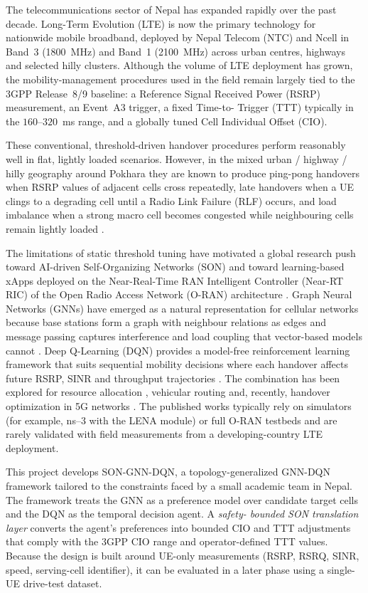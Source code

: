 \documentclass[12pt,a4paper,oneside]{report}
\begin{document}
The telecommunications sector of Nepal has expanded rapidly over the past
decade. Long-Term Evolution (LTE) is now the primary technology for
nationwide mobile broadband, deployed by Nepal Telecom (NTC) and Ncell in
Band~3 (1800~MHz) and Band~1 (2100~MHz) across urban centres, highways
and selected hilly clusters. Although the volume of LTE deployment has
grown, the mobility-management procedures used in the field remain
largely tied to the 3GPP Release~8/9 baseline: a Reference Signal
Received Power (RSRP) measurement, an Event~A3 trigger, a fixed Time-to-
Trigger (TTT) typically in the $160$--$320$~ms range, and a globally
tuned Cell Individual Offset (CIO).

These conventional, threshold-driven handover procedures perform
reasonably well in flat, lightly loaded scenarios. However, in the
mixed urban / highway / hilly geography around Pokhara they are known to
produce ping-pong handovers when RSRP values of adjacent cells cross
repeatedly, late handovers when a UE clings to a degrading cell until a
Radio Link Failure (RLF) occurs, and load imbalance when a strong macro
cell becomes congested while neighbouring cells remain lightly loaded
\cite{3gpp_36839,zhang_mlb_2021}.

The limitations of static threshold tuning have motivated a global
research push toward AI-driven Self-Organizing Networks (SON) and toward
learning-based xApps deployed on the Near-Real-Time RAN Intelligent
Controller (Near-RT RIC) of the Open Radio Access Network (O-RAN)
architecture \cite{oran_alliance_wg2,polese_oran_survey}. Graph Neural
Networks (GNNs) have emerged as a natural representation for cellular
networks because base stations form a graph with neighbour relations as
edges and message passing captures interference and load coupling that
vector-based models cannot \cite{kipf_gcn,velickovic_gat,hamilton_graphsage}.
Deep Q-Learning (DQN) provides a model-free reinforcement learning
framework that suits sequential mobility decisions where each handover
affects future RSRP, SINR and throughput trajectories
\cite{mnih_dqn_2015}. The combination has been explored for resource
allocation \cite{wang_gnn_rl_2022}, vehicular routing
\cite{he_vanet_gnn} and, recently, handover optimization in 5G networks
\cite{tang_handover_drl,zhao_gnn_handover}. The published works typically
rely on simulators (for example, ns--3 with the LENA module) or full
O-RAN testbeds and are rarely validated with field measurements from a
developing-country LTE deployment.

This project develops SON-GNN-DQN, a topology-generalized GNN-DQN
framework tailored to the constraints faced by a small academic team in
Nepal. The framework treats the GNN as a preference model over candidate
target cells and the DQN as the temporal decision agent. A \emph{safety-
bounded SON translation layer} converts the agent's preferences into
bounded CIO and TTT adjustments that comply with the 3GPP CIO range and
operator-defined TTT values. Because the design is built around UE-only
measurements (RSRP, RSRQ, SINR, speed, serving-cell identifier), it can
be evaluated in a later phase using a single-UE drive-test dataset.
\end{document}
